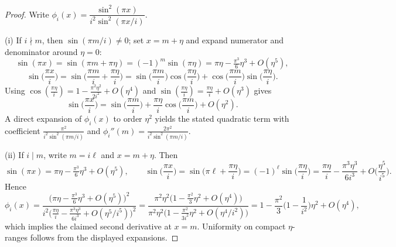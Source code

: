 \begin{proof}
Write $\phi_i(x)=\dfrac{\sin^2(\pi x)}{i^2\sin^2(\pi x/i)}$. 

(i) If $i\nmid m$, then $\sin(\pi m/i)\neq 0$; set $x=m+\eta$ and expand numerator and denominator around $\eta=0$:
\[
\sin(\pi x)=\sin(\pi m+\pi\eta)=(-1)^m\sin(\pi\eta)=\pi\eta-\tfrac{\pi^3}{6}\eta^3+O(\eta^5),
\]
\[
\sin\!\Big(\frac{\pi x}{i}\Big)=\sin\!\Big(\frac{\pi m}{i}+\frac{\pi\eta}{i}\Big)
=\sin\!\Big(\frac{\pi m}{i}\Big)\cos\!\Big(\frac{\pi\eta}{i}\Big)
+\cos\!\Big(\frac{\pi m}{i}\Big)\sin\!\Big(\frac{\pi\eta}{i}\Big).
\]
Using $\cos(\tfrac{\pi\eta}{i})=1-\tfrac{\pi^2\eta^2}{2i^2}+O(\eta^4)$ and $\sin(\tfrac{\pi\eta}{i})=\tfrac{\pi\eta}{i}+O(\eta^3)$ gives
\[
\sin\!\Big(\frac{\pi x}{i}\Big)=\sin\!\Big(\frac{\pi m}{i}\Big)+\frac{\pi\eta}{i}\cos\!\Big(\frac{\pi m}{i}\Big)+O(\eta^2).
\]
A direct expansion of $\phi_i(x)$ to order $\eta^2$ yields the stated quadratic term with coefficient $\frac{\pi^2}{i^2\sin^2(\pi m/i)}$ and $\phi_i''(m)=\frac{2\pi^2}{i^2\sin^2(\pi m/i)}$.

(ii) If $i\mid m$, write $m=i\ell$ and $x=m+\eta$. Then
\[
\sin(\pi x)=\pi\eta-\tfrac{\pi^3}{6}\eta^3+O(\eta^5),\qquad
\sin\!\Big(\frac{\pi x}{i}\Big)=\sin\!\Big(\pi\ell+\frac{\pi\eta}{i}\Big)=(-1)^\ell\sin\!\Big(\frac{\pi\eta}{i}\Big)=\frac{\pi\eta}{i}-\frac{\pi^3\eta^3}{6i^3}+O\!\Big(\frac{\eta^5}{i^5}\Big).
\]
Hence
\[
\phi_i(x)=\frac{\big(\pi\eta-\tfrac{\pi^3}{6}\eta^3+O(\eta^5)\big)^2}{i^2\big(\tfrac{\pi\eta}{i}-\tfrac{\pi^3\eta^3}{6i^3}+O(\eta^5/i^5)\big)^2}
=\frac{\pi^2\eta^2\big(1-\tfrac{\pi^2}{3}\eta^2+O(\eta^4)\big)}{\pi^2\eta^2\big(1-\tfrac{\pi^2}{3i^2}\eta^2+O(\eta^4/i^2)\big)}
=1-\frac{\pi^2}{3}\Big(1-\frac{1}{i^2}\Big)\eta^2+O(\eta^4),
\]
which implies the claimed second derivative at $x=m$. Uniformity on compact $\eta$-ranges follows from the displayed expansions.
\end{proof}


